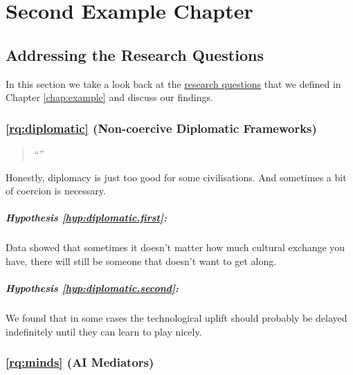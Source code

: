 \cleardoublepageforprint	%

\chapter{Second Example Chapter}
\label{chap:example2}

\section{Addressing the Research Questions}
\label{sec:example2.rq}

In this section we take a look back at the \hyperref[sec:example.rq]{research questions} that we defined in Chapter \ref{chap:example} and discuss our findings.

\subsection*{\ref{rq:diplomatic} (Non-coercive Diplomatic Frameworks)}
\label{subsec:example2.rq:diplomatic}

\begin{quote}
	\textit{``\RQDiplomatic''}
\end{quote}

Honestly, diplomacy is just too good for some civilisations.  And sometimes a bit of coercion is necessary.

\paragraph*{Hypothesis \ref{hyp:diplomatic.first}:} \textit{\HDiplomaticA}

Data showed that sometimes it doesn't matter how much cultural exchange you have, there will still be someone that doesn't want to get along.

\paragraph*{Hypothesis \ref{hyp:diplomatic.second}:} \textit{\HDiplomaticB}

We found that in some cases the technological uplift should probably be delayed indefinitely until they can learn to play nicely.


\subsection*{\ref{rq:minds} (AI Mediators)}
\label{subsec:example2.rq:minds}

